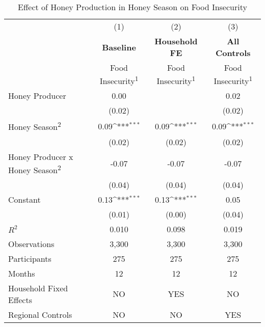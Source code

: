 \begin{table}[htbp]\centering \small
\def\sym#1{\ifmmode^{#1}\else\(^{#1}\)\fi}
\caption{Effect of Honey Production in Honey Season on Food Insecurity \label{table_DiD}}
\begin{tabular}{l*{3}{c}}
\toprule
                    &\multicolumn{1}{c}{(1)}&\multicolumn{1}{c}{(2)}&\multicolumn{1}{c}{(3)}\\
                    &\multicolumn{1}{c}{  \textbf{Baseline}  }&\multicolumn{1}{c}{\textbf{Household FE}}&\multicolumn{1}{c}{ \textbf{All Controls}}\\
                    &Food Insecurity\textsuperscript{1}         &Food Insecurity\textsuperscript{1}         &Food Insecurity\textsuperscript{1}         \\
\midrule
Honey Producer      &        0.00         &                   &        0.02         \\
                    &      (0.02)         &                   &      (0.02)         \\
\addlinespace
Honey Season\textsuperscript{2}&        0.09\sym{***}&        0.09\sym{***}&        0.09\sym{***}\\
                    &      (0.02)         &      (0.02)         &      (0.02)         \\
\addlinespace
Honey Producer x Honey Season\textsuperscript{2}&       -0.07         &       -0.07         &       -0.07         \\
                    &      (0.04)         &      (0.04)         &      (0.04)         \\
\addlinespace
Constant            &        0.13\sym{***}&        0.13\sym{***}&        0.05         \\
                    &      (0.01)         &      (0.00)         &      (0.04)         \\
\midrule
\(R^{2}\)           &       0.010         &       0.098         &       0.019         \\
Observations        &       3,300         &       3,300         &       3,300         \\
Participants        &         275         &         275         &         275         \\
Months              &          12         &          12         &          12         \\
\hline Household Fixed Effects&          NO         &         YES         &          NO         \\
Regional Controls   &          NO         &          NO         &         YES         \\

\end{tabular}
\end{table}
